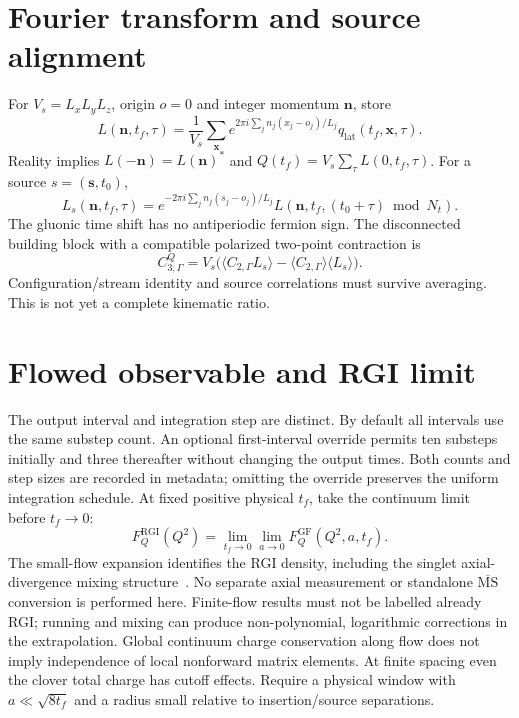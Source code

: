 \documentclass[11pt,a4paper]{article}
\begin{document}
\section{Fourier transform and source alignment}
For $V_s=L_xL_yL_z$, origin $o=0$ and integer momentum $\mathbf n$, store
\begin{equation}
 L(\mathbf n,t_f,\tau)=\frac1{V_s}\sum_{\mathbf x}
 e^{2\pi i\sum_j n_j(x_j-o_j)/L_j}q_{\mathrm{lat}}(t_f,\mathbf x,\tau).
\end{equation}
Reality implies $L(-\mathbf n)=L(\mathbf n)^*$ and
$Q(t_f)=V_s\sum_\tau L(0,t_f,\tau)$.
For a source $s=(\mathbf s,t_0)$,
\begin{equation}
 L_s(\mathbf n,t_f,\tau)=e^{-2\pi i\sum_jn_j(s_j-o_j)/L_j}
 L(\mathbf n,t_f,(t_0+\tau)\bmod N_t).
\end{equation}
The gluonic time shift has no antiperiodic fermion sign. The disconnected
building block with a compatible polarized two-point contraction is
\begin{equation}
 C_{3,\Gamma}^{Q}=V_s\bigl(\langle C_{2,\Gamma}L_s\rangle
 -\langle C_{2,\Gamma}\rangle\langle L_s\rangle\bigr).
\end{equation}
Configuration/stream identity and source correlations must survive averaging.
This is not yet a complete kinematic ratio.

\section{Flowed observable and RGI limit}
The output interval and integration step are distinct. By default all intervals
use the same substep count. An optional first-interval override permits ten
substeps initially and three thereafter without changing the output times.
Both counts and step sizes are recorded in metadata; omitting the override
preserves the uniform integration schedule.
At fixed positive physical $t_f$, take the continuum limit before $t_f\to0$:
\begin{equation}
 F_Q^{\mathrm{RGI}}(Q^2)=\lim_{t_f\to0}\lim_{a\to0}
 F_Q^{\mathrm{GF}}(Q^2,a,t_f).
\end{equation}
The small-flow expansion identifies the RGI density, including the singlet
axial-divergence mixing structure~\cite{luscher,lw}. No separate axial
measurement or standalone $\overline{\mathrm{MS}}$ conversion is performed
here. Finite-flow results must not be labelled already RGI; running and mixing
can produce non-polynomial, logarithmic corrections in the extrapolation.
Global continuum charge conservation along flow does not imply independence
of local nonforward matrix elements. At finite spacing even the clover total
charge has cutoff effects. Require a physical window with
$a\ll\sqrt{8t_f}$ and a radius small relative to insertion/source separations.
\end{document}
